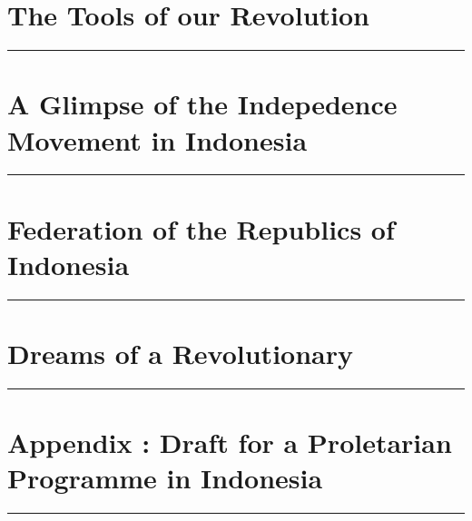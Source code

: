 \documentclass[12pt, oneside, a4paper]{memoir}
\begin{document}
    \chapter{\centering The Tools of our Revolution}
    \hrule
    \vspace*{1cm}
    

    \chapter{\centering A Glimpse of the Indepedence Movement in Indonesia}
    \hrule
    \vspace*{1cm}
    

    \chapter{\centering Federation of the Republics of Indonesia}
    \hrule
    \vspace*{1cm}
    

    \chapter{\centering Dreams of a Revolutionary}
    \hrule
    \vspace*{1cm}
    

    \chapter{\centering Appendix : Draft for a Proletarian Programme in Indonesia}
    \hrule
    \vspace*{1cm}
    
\end{document}
